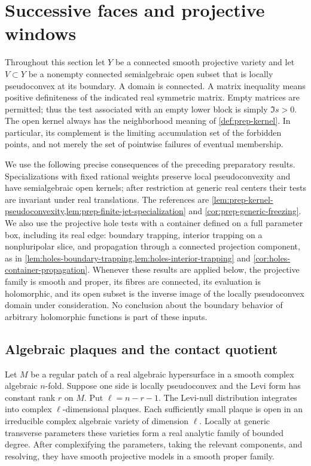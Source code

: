 \section{Successive faces and projective windows}\label{sec:win-section}

Throughout this section let $Y$ be a connected smooth projective variety and let $V\subset Y$ be a nonempty connected semialgebraic open subset that is locally pseudoconvex at its boundary.  A domain is connected. A matrix inequality means positive definiteness of the indicated real symmetric matrix.  Empty matrices are permitted; thus the test associated with an empty lower block is simply $\Im s>0$.  The open kernel always has the neighborhood meaning of \cref{def:prep-kernel}.  In particular, its complement is the limiting accumulation set of the forbidden points, and not merely the set of pointwise failures of eventual membership.

We use the following precise consequences of the preceding preparatory results.  Specializations with fixed rational weights preserve local pseudoconvexity and have semialgebraic open kernels; after restriction at generic real centers their tests are invariant under real translations. The references are \cref{lem:prep-kernel-pseudoconvexity,lem:prep-finite-jet-specialization} and \cref{cor:prep-generic-freezing}. We also use the projective hole tests with a container defined on a full parameter box, including its real edge: boundary trapping, interior trapping on a nonpluripolar slice, and propagation through a connected projection component, as in \cref{lem:holes-boundary-trapping,lem:holes-interior-trapping} and \cref{cor:holes-container-propagation}. Whenever these results are applied below, the projective family is smooth and proper, its fibres are connected, its evaluation is holomorphic, and its open subset is the inverse image of the locally pseudoconvex domain under consideration.  No conclusion about the boundary behavior of arbitrary holomorphic functions is part of these inputs.

\subsection{Algebraic plaques and the contact quotient}

\begin{lemma}\label{lem:win-plaques}
Let $M$ be a regular patch of a real algebraic hypersurface in a smooth complex algebraic $n$-fold.  Suppose one side is locally pseudoconvex and the Levi form has constant rank $r$ on $M$.  Put $\ell=n-r-1$. The Levi-null distribution integrates into complex $\ell$-dimensional plaques.  Each sufficiently small plaque is open in an irreducible complex algebraic variety of dimension $\ell$.  Locally at generic transverse parameters these varieties form a real analytic family of bounded degree. After complexifying the parameters, taking the relevant components, and resolving, they have smooth projective models in a smooth proper family.
\end{lemma}

